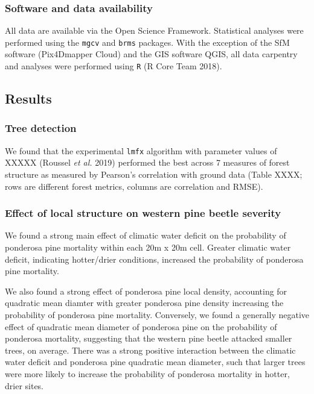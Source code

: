 \documentclass[]{article}
\begin{document}
\subsubsection{Software and data
availability}\label{software-and-data-availability}

All data are available via the Open Science Framework. Statistical
analyses were performed using the \texttt{mgcv} and \texttt{brms}
packages. With the exception of the SfM software (Pix4Dmapper Cloud) and
the GIS software QGIS, all data carpentry and analyses were performed
using \texttt{R} (R Core Team 2018).

\subsection{Results}\label{results}

\subsubsection{Tree detection}\label{tree-detection-1}

We found that the experimental \texttt{lmfx} algorithm with parameter
values of XXXXX (Roussel \emph{et al.} 2019) performed the best across 7
measures of forest structure as measured by Pearson's correlation with
ground data (Table XXXX; rows are different forest metrics, columns are
correlation and RMSE).

\subsubsection{Effect of local structure on western pine beetle
severity}\label{effect-of-local-structure-on-western-pine-beetle-severity}

We found a strong main effect of climatic water deficit on the
probability of ponderosa pine mortality within each 20m x 20m cell.
Greater climatic water deficit, indicating hotter/drier conditions,
increased the probability of ponderosa pine mortality.

We also found a strong effect of ponderosa pine local density,
accounting for quadratic mean diamter with greater ponderosa pine
density increasing the probability of ponderosa pine mortality.
Conversely, we found a generally negative effect of quadratic mean
diameter of ponderosa pine on the probability of ponderosa mortality,
suggesting that the western pine beetle attacked smaller trees, on
average. There was a strong positive interaction between the climatic
water deficit and ponderosa pine quadratic mean diameter, such that
larger trees were more likely to increase the probability of ponderosa
mortality in hotter, drier sites.
\end{document}
